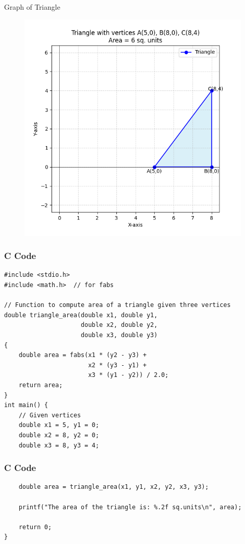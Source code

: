 \documentclass{beamer}
\begin{document}
\begin{frame}{Graph of Triangle}
\begin{figure}
\centering
\includegraphics[height=0.6\textheight, keepaspectratio]{figs/q4.png}
\end{figure}
\end{frame}

\begin{frame}[fragile]
    \frametitle{C Code}
\begin{lstlisting}
#include <stdio.h>
#include <math.h>  // for fabs

// Function to compute area of a triangle given three vertices
double triangle_area(double x1, double y1,
                     double x2, double y2,
                     double x3, double y3)
{
    double area = fabs(x1 * (y2 - y3) +
                       x2 * (y3 - y1) +
                       x3 * (y1 - y2)) / 2.0;
    return area;
}
int main() {
    // Given vertices
    double x1 = 5, y1 = 0;
    double x2 = 8, y2 = 0;
    double x3 = 8, y3 = 4;

\end{lstlisting}
\end{frame}

\begin{frame}[fragile]
    \frametitle{C Code}
\begin{lstlisting}
    double area = triangle_area(x1, y1, x2, y2, x3, y3);

    printf("The area of the triangle is: %.2f sq.units\n", area);

    return 0;
}
\end{lstlisting}
\end{frame}
\end{document}
